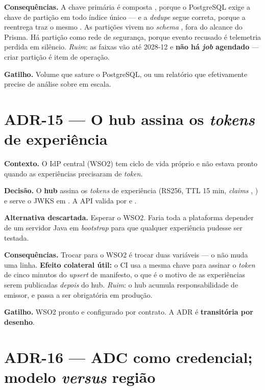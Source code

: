 \textbf{Consequências.} A chave primária é composta , porque o
PostgreSQL exige a chave de partição em todo índice único --- e a \emph{dedupe}
segue correta, porque a reentrega traz o mesmo . As partições vivem no
\emph{schema} , fora do alcance do Prisma. Há partição
 como rede de segurança, porque evento recusado é telemetria perdida
em silêncio. \emph{Ruim}: as faixas vão até 2028-12 e \textbf{não há \emph{job}
agendado} --- criar partição é item de operação.

\textbf{Gatilho.} Volume que sature o PostgreSQL, ou um relatório que
efetivamente precise de análise sobre  em escala.

\section{ADR-15 --- O hub assina os \emph{tokens} de experiência}

\textbf{Contexto.} O IdP central (WSO2) tem ciclo de vida próprio e não estava
pronto quando as experiências precisaram de \emph{token}.

\textbf{Decisão.} O \textbf{hub} assina os \emph{tokens} de experiência (RS256,
TTL 15 min, \emph{claims} , 
) e serve o JWKS em . A API valida
por  e .

\textbf{Alternativa descartada.} Esperar o WSO2. Faria toda a plataforma depender
de um servidor Java em \emph{bootstrap} para que qualquer experiência pudesse ser
testada.

\textbf{Consequências.} Trocar para o WSO2 é trocar duas variáveis --- o
 não muda uma linha. \textbf{Efeito colateral útil:} o CI usa a
mesma chave para assinar o \emph{token} de cinco minutos do \emph{upsert} de
manifesto, o que é o motivo de as experiências serem publicadas \emph{depois} do
hub. \emph{Ruim}: o hub acumula responsabilidade de emissor, e
 passa a ser obrigatória em produção.

\textbf{Gatilho.} WSO2 pronto e configurado por contrato. A ADR é
\textbf{transitória por desenho}.

\section{ADR-16 --- ADC como credencial; modelo \emph{versus} região}

